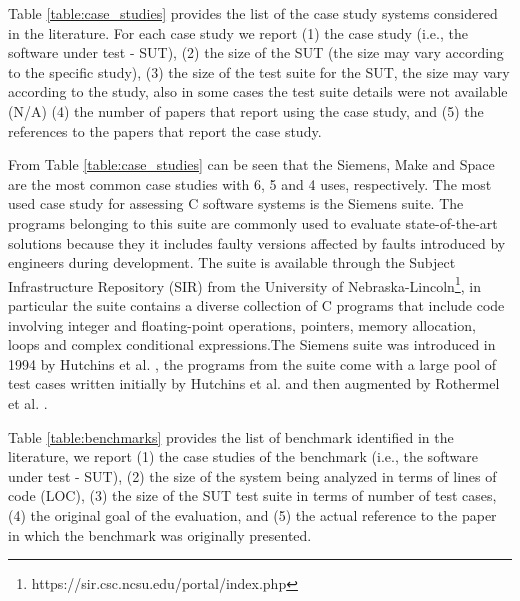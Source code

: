 

Table \ref{table:case_studies} provides the list of the case study systems considered in the literature. For each case study we report (1) the case study (i.e., the software under test - SUT), (2) the size of the SUT (the size may vary according to the specific study), (3) the size of the test suite for the SUT, the size may vary according to the study, also in some cases the test suite details were not available (N/A) (4) the number of papers that report using the case study, and (5) the references to the papers that report the case study.


From Table \ref{table:case_studies} can be seen that the Siemens, Make and Space are the most common case studies with 6, 5 and 4 uses, respectively. 
The most used case study for assessing C software systems is the Siemens suite. The programs belonging to this suite are commonly used to evaluate state-of-the-art solutions because they it includes faulty versions affected by faults introduced by engineers during development. The suite is available through the Subject Infrastructure Repository (SIR) from the University of Nebraska-Lincoln\footnote{https://sir.csc.ncsu.edu/portal/index.php}, in particular the suite contains a diverse collection of C programs that include code involving integer and floating-point operations, pointers, memory allocation, loops and complex conditional expressions.The Siemens suite was introduced in 1994 by Hutchins et al. \cite{hutchins1994experiments}, the programs from the suite come with a large pool of test cases written initially by Hutchins et al. and then augmented by Rothermel et al. \cite{rothermel1998empirical}.

Table \ref{table:benchmarks} provides the list of benchmark identified in the literature, we report (1) the case studies of the benchmark (i.e., the software under test - SUT), (2) the size of the system being analyzed in terms of lines of code (LOC), (3) the size of the SUT test suite in terms of number of test cases, (4) the original goal of the evaluation, and (5) the actual reference to the paper in which the benchmark was originally presented. 




